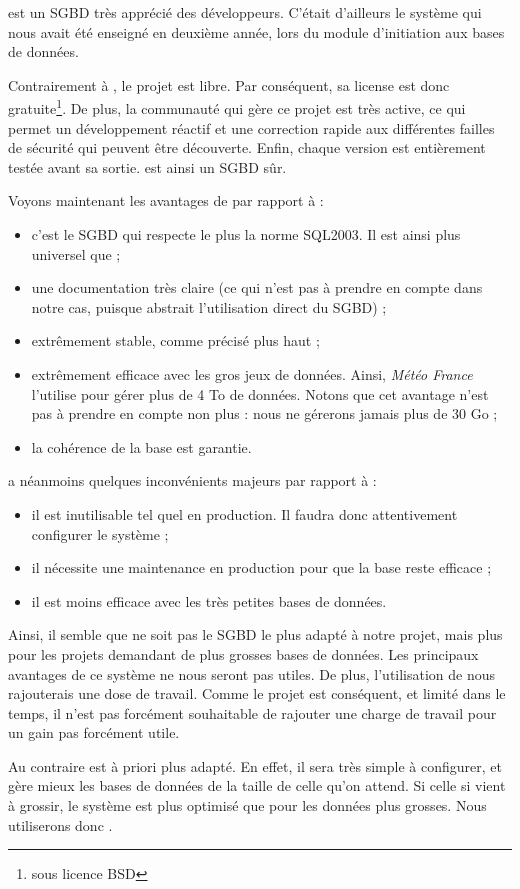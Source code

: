 \psql est un SGBD très apprécié des développeurs. C'était d'ailleurs le système qui nous avait été enseigné en deuxième année, lors du module d'initiation aux bases de données. 

Contrairement à \mysql, le projet est libre. Par conséquent, sa license est donc gratuite\footnote{sous licence BSD}. De plus, la communauté qui gère ce projet est très active, ce qui permet un développement réactif et une correction rapide aux différentes failles de sécurité qui peuvent être découverte. 
Enfin, chaque version est entièrement testée avant sa sortie. \psql est ainsi un SGBD sûr. 

Voyons maintenant les avantages de \psql par rapport à \mdb : 

\begin{itemize}
\item c'est le SGBD qui respecte le plus la norme SQL2003. Il est ainsi plus universel que \mdb ;
\item une documentation très claire (ce qui n'est pas à prendre en compte dans notre cas, puisque \symfony abstrait l'utilisation direct du SGBD) ;
\item extrêmement stable, comme précisé plus haut ;
\item extrêmement efficace avec les gros jeux de données. Ainsi, \textit{Météo France} l'utilise pour gérer plus de 4 To de données. Notons que cet avantage n'est pas à prendre en compte non plus : nous ne gérerons jamais plus de 30 Go ;
\item la cohérence de la base est garantie.
\end{itemize}

\psql a néanmoins quelques inconvénients majeurs  par rapport à \mdb : 

\begin{itemize}
\item il est inutilisable tel quel en production. Il faudra donc attentivement configurer le système ;
\item il nécessite une maintenance en production pour que la base reste efficace ;
\item il est moins efficace avec les très petites bases de données.  
\end{itemize}

\bigbreak
Ainsi, il semble que \psql ne soit pas le SGBD le plus adapté à notre projet, mais plus pour les projets demandant de plus grosses bases de données. 
Les principaux avantages de ce système ne nous seront pas utiles. De plus, l'utilisation de \psql nous rajouterais une dose de travail. Comme le projet est conséquent, et limité dans le temps, il n'est pas forcément souhaitable de rajouter une charge de travail pour un gain pas forcément utile. 

Au contraire \mdb est à priori plus adapté. En effet, il sera très simple à configurer, et gère mieux les bases de données de la taille de celle qu'on attend. Si celle si vient à grossir, le système est plus optimisé que \mysql pour les données plus grosses. Nous utiliserons donc \mdb. 
